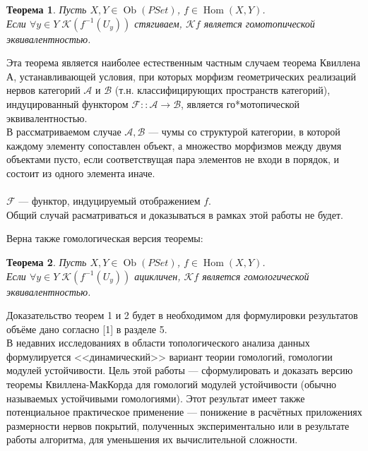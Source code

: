 \documentclass[a4paper,12pt]{report}
\newtheorem{theorem}{Теорема}
\begin{document}
\begin{theorem}
  Пусть $X, Y \in \operatorname{Ob}(PSet)$, $f \in \operatorname{Hom}(X,Y)$.\\
  Если $\forall y \in Y\;\mathcal{K}(f^{-1}(U_y))$ стягиваем, $\mathcal{K}f$ является гомотопической эквивалентностью.\\
\end{theorem}

\begin{itshape}
Эта теорема является наиболее естественным частным случаем теорема Квиллена $А$, устанавливающей условия, при которых морфизм геометрических реализаций нервов категорий $\mathcal{A}$ и $\mathcal{B}$ (т.н. классифицирующих пространств категорий), индуцированный функтором $\mathcal{F} :: \mathcal{A} \to \mathcal{B}$, является го*мотопической эквивалентностью.\\
В рассматриваемом случае $\mathcal{A}, \mathcal{B}$ --- чумы со структурой категории, в которой каждому элементу сопоставлен объект, а множество морфизмов между двумя объектами пусто, если соответствущая пара элементов не входи в порядок, и состоит из одного элемента иначе.\\ \\ $\mathcal{F}$ --- функтор, индуцируемый отображением $f$.\\
Общий случай расматриваться и доказываться в рамках этой работы не будет.
\end{itshape}

Верна также гомологическая версия теоремы:
\begin{theorem}
  Пусть $X, Y \in \operatorname{Ob}(PSet)$, $f \in \operatorname{Hom}(X,Y)$.\\
  Если $\forall y \in Y\;\mathcal{K}(f^{-1}(U_y))$ ацикличен, $\mathcal{K}f$ является гомологической эквивалентностью.\\
\end{theorem}

Доказательство теорем 1 и 2 будет в необходимом для формулировки результатов объёме дано согласно [1] в разделе 5.\\

В недавних исследованиях в области топологического анализа данных формулируется <<динамический>> вариант теории гомологий, гомологии модулей устойчивости. Цель этой работы --- сформулировать и доказать версию теоремы Квиллена-МакКорда для гомологий модулей устойчивости (обычно называемых устойчивыми гомологиями). Этот результат имеет также потенциальное практическое применение --- понижение в расчётных приложениях размерности нервов покрытий, полученных экспериментально или в результате работы алгоритма, для уменьшения их вычислительной сложности.
\end{document}
